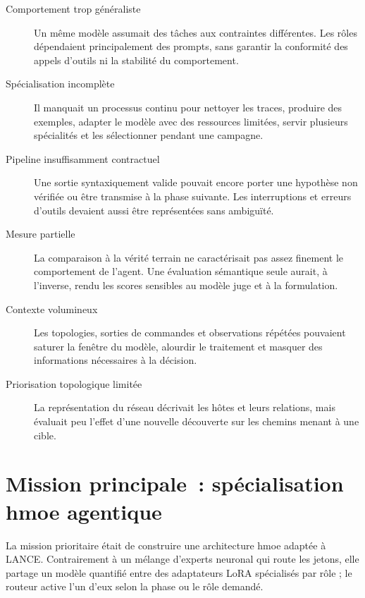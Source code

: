 \begin{description}
  \item[Comportement trop généraliste] Un même modèle assumait des tâches aux
  contraintes différentes. Les rôles dépendaient principalement des prompts,
  sans garantir la conformité des appels d'outils ni la stabilité du
  comportement.

  \item[Spécialisation incomplète] Il manquait un processus continu pour
  nettoyer les traces, produire des exemples, adapter le modèle avec des
  ressources limitées, servir plusieurs spécialités et les sélectionner pendant
  une campagne.

  \item[Pipeline insuffisamment contractuel] Une sortie syntaxiquement valide
  pouvait encore porter une hypothèse non vérifiée ou être transmise à la phase
  suivante. Les interruptions et erreurs d'outils devaient aussi être
  représentées sans ambiguïté.

  \item[Mesure partielle] La comparaison à la vérité terrain ne caractérisait
  pas assez finement le comportement de l'agent. Une évaluation sémantique seule
  aurait, à l'inverse, rendu les scores sensibles au modèle juge et à la
  formulation.

  \item[Contexte volumineux] Les topologies, sorties de commandes et observations
  répétées pouvaient saturer la fenêtre du modèle, alourdir le traitement et masquer
  des informations nécessaires à la décision.

  \item[Priorisation topologique limitée] La représentation du réseau décrivait
  les hôtes et leurs relations, mais évaluait peu l'effet d'une nouvelle
  découverte sur les chemins menant à une cible.
\end{description}

\section{Mission principale~: spécialisation \gls{hmoe} agentique}

La mission prioritaire était de construire une architecture \gls{hmoe} adaptée à
LANCE. Contrairement à un mélange d'experts neuronal qui route les jetons, elle
partage un modèle quantifié entre des adaptateurs LoRA spécialisés par rôle ; le
routeur active l'un d'eux selon la phase ou le rôle demandé.

